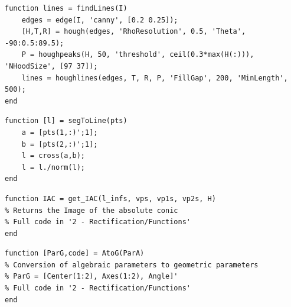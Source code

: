 \documentclass[12pt,a4paper]{article}
\begin{document}
\begin{verbatim}
function lines = findLines(I)
    edges = edge(I, 'canny', [0.2 0.25]);
    [H,T,R] = hough(edges, 'RhoResolution', 0.5, 'Theta', -90:0.5:89.5);
    P = houghpeaks(H, 50, 'threshold', ceil(0.3*max(H(:))), 'NHoodSize', [97 37]);
    lines = houghlines(edges, T, R, P, 'FillGap', 200, 'MinLength', 500);
end
\end{verbatim}

\begin{verbatim}
function [l] = segToLine(pts)
    a = [pts(1,:)';1];
    b = [pts(2,:)';1];
    l = cross(a,b);
    l = l./norm(l);
end
\end{verbatim}

\begin{verbatim}
function IAC = get_IAC(l_infs, vps, vp1s, vp2s, H)
% Returns the Image of the absolute conic
% Full code in '2 - Rectification/Functions'
end
\end{verbatim}

\begin{verbatim}
function [ParG,code] = AtoG(ParA)
% Conversion of algebraic parameters to geometric parameters
% ParG = [Center(1:2), Axes(1:2), Angle]'
% Full code in '2 - Rectification/Functions'
end
\end{verbatim}

\pagebreak

\large


\end{document}
